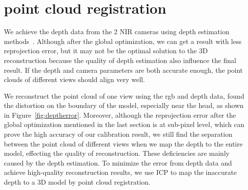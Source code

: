 \section{point cloud registration}
\label{sec:registration}

We achieve the depth data from the 2 NIR cameras using depth estimation methods~\cite{Bleyer2011PatchMatch}. Although after the global optimization, we can get a result with less reprojection error, but it may not be the optimal solution to the 3D reconstruction because the quality of depth estimation also influence the final result. If the depth and camera parameters are both accurate enough, the point clouds of different views should align very well.

We reconstruct the point cloud of one view using the rgb and depth data, found the distortion on the boundary of the model, especially near the head, as shown in Figure~\ref{fig:deptherror}. Moreover, although the reprojection error after the global optimization mentioned in the last section is at sub-pixel level, which can prove the high accuracy of our calibration result, we still find the separation between the point cloud of different views when we map the depth to the entire model, effecting the quality of reconstruction. These deficiencies are mainly caused by the depth estimation.
%
To minimize the error from depth data and achieve high-quality reconstruction results, we use ICP to map the inaccurate depth to a 3D model by point cloud registration.

